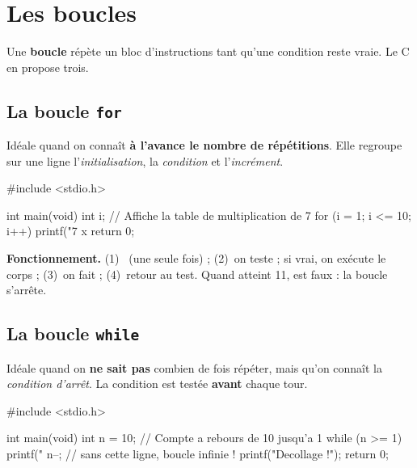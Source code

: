 \section{Les boucles}

Une \textbf{boucle} répète un bloc d'instructions tant qu'une condition reste vraie.
Le C en propose trois.

\subsection{La boucle \texttt{for}}

Idéale quand on connaît \textbf{à l'avance le nombre de répétitions}. Elle regroupe
sur une ligne l'\emph{initialisation}, la \emph{condition} et l'\emph{incrément}.

\begin{syntaxe}
\end{syntaxe}

\begin{codec}
#include <stdio.h>

int main(void) {
    int i;
    // Affiche la table de multiplication de 7
    for (i = 1; i <= 10; i++) {
        printf("7 x %
    }
    return 0;
}
\end{codec}


\textbf{Fonctionnement.} (1)~ (une seule fois) ; (2)~on teste
 ; si vrai, on exécute le corps ; (3)~on fait  ; (4)~retour
au test. Quand  atteint 11,  est faux : la boucle s'arrête.

\subsection{La boucle \texttt{while}}

Idéale quand on \textbf{ne sait pas} combien de fois répéter, mais qu'on connaît la
\emph{condition d'arrêt}. La condition est testée \textbf{avant} chaque tour.

\begin{syntaxe}
\end{syntaxe}

\begin{codec}
#include <stdio.h>

int main(void) {
    int n = 10;
    // Compte a rebours de 10 jusqu'a 1
    while (n >= 1) {
        printf("%
        n--;                 // sans cette ligne, boucle infinie !
    }
    printf("Decollage !\n");
    return 0;
}
\end{codec}

